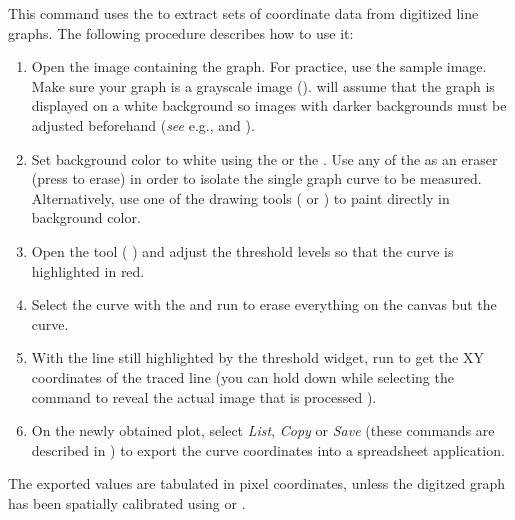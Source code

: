 This command uses the  to extract sets
of coordinate data from digitized line graphs.
The following procedure describes how to use it:
\begin{enumerate}
\item Open the image containing the graph. For practice, use the sample
image. Make sure your graph is a grayscale image ().
 will assume that the graph is
displayed on a white background so images with darker backgrounds
must be adjusted beforehand (\emph{see} e.g., 
and ).
\item Set background color to white using the 
or the . Use any of the 
as an eraser (press  to erase) in order to
isolate the single graph curve to be measured. Alternatively, use
one of the drawing tools ( or )
to paint directly in background color.
\item Open the  tool (
) and adjust the threshold levels so that the curve
is highlighted in red.
\item Select the curve with the  and run 
to erase everything on the canvas but the curve.
\item With the line still highlighted by the threshold widget, run 
to get the XY coordinates of the traced line (you can hold down 
while selecting the command to reveal the actual image that is processed
).
\item On the newly obtained plot, select \emph{List}, \emph{Copy} or \emph{Save}
(these commands are described in )
to export the curve coordinates into a spreadsheet application.
\end{enumerate}
The exported values are tabulated in pixel coordinates, unless the
digitzed graph has been spatially calibrated using 
or .


